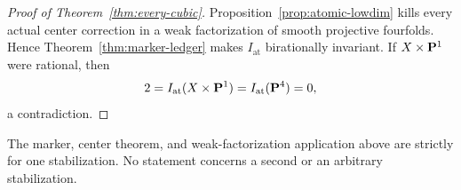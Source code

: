 \begin{proof}[Proof of Theorem~\ref{thm:every-cubic}]
Proposition~\ref{prop:atomic-lowdim} kills every actual center correction in
a weak factorization of smooth projective fourfolds.  Hence
Theorem~\ref{thm:marker-ledger} makes \(I_{\mathrm{at}}\) birationally
invariant.  If \(X\times\mathbf P^1\) were rational, then
\[
 2=I_{\mathrm{at}}(X\times\mathbf P^1)
 =I_{\mathrm{at}}(\mathbf P^4)=0,
\]
a contradiction.
%
\end{proof}

\begin{remark}[Scope]
The marker, center theorem, and weak-factorization application above are
strictly for one stabilization.  No statement concerns a second or an
arbitrary stabilization.
\end{remark}
